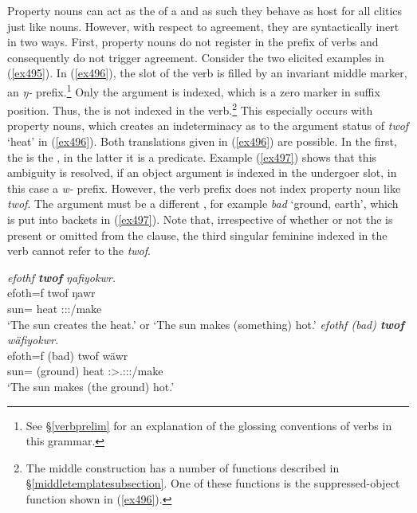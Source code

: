 Property nouns can act as the  of a  and as such they behave as host for all  clitics just like nouns. However, with respect to agreement, they are syntactically inert in two ways. First, property nouns do not register in the  prefix of verbs and consequently do not trigger  agreement. Consider the two elicited examples in (\ref{ex495}). In (\ref{ex496}), the  slot of the verb is filled by an invariant middle marker, an \emph{ŋ-} prefix.\footnote{See \S\ref{verbprelim} for an explanation of the glossing conventions of verbs in this grammar.} Only the  argument is indexed, which is a zero marker in suffix position. Thus, the  is not indexed in the verb.\footnote{The middle construction has a number of functions described in {\S}\ref{middletemplatesubsection}. One of these functions is the suppressed-object function shown in (\ref{ex496}).} This especially occurs with property nouns, which creates an indeterminacy as to the argument status of \emph{twof} `heat' in (\ref{ex496}). Both translations given in (\ref{ex496}) are possible. In the first, the  is the , in the latter it is a  predicate. Example (\ref{ex497}) shows that this ambiguity is resolved, if an object argument is indexed in the undergoer slot, in this case a \emph{w-} prefix. However, the verb prefix does not index property noun like \emph{twof}. The  argument must be a different , for example \emph{bad} `ground, earth', which is put into backets in (\ref{ex497}). Note that, irrespective of whether or not the   is present or omitted from the clause, the third singular feminine indexed in the verb cannot refer to the  \emph{twof}.

\begin{exe}
	\ex \label{ex495}
	\begin{xlist}
	\ex \emph{efothf \textbf{twof} ŋafiyokwr.}\\
	\gll efoth=f twof ŋawr\\
	sun={\Erg} heat \Stsg:\Sbj:\Nonpast:\Ipfv/make\\
	\trans `The sun creates the heat.' or `The sun makes (something) hot.'
	\label{ex496}
	\ex \emph{efothf (bad) \textbf{twof} wäfiyokwr.}\\
	\gll efoth=f (bad) twof wäwr\\
	sun={\Erg} (ground) heat \Stsg:\Sbj>\Tsg.\F:\Obj:\Nonpast:\Ipfv/make\\
	\trans `The sun makes (the ground) hot.'
	\label{ex497}
	\end{xlist}
\end{exe}

